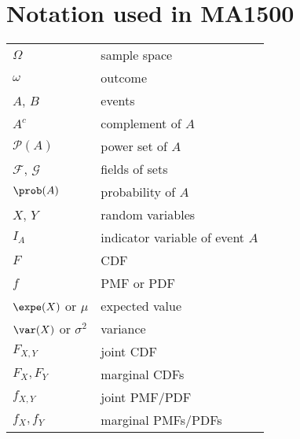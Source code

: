\section*{Notation used in MA1500}
\begin{tabular}{ll}
$\Omega$						& sample space \\
$\omega$						& outcome \\
$A$, $B$ 						& events \\
$A^c$							& complement of $A$ \\
$\mathcal{P}(A)$				& power set of $A$\\
$\mathcal{F}$, $\mathcal{G}$	& fields of sets \\
$\prob(A)$						& probability of $A$ \\
$X$, $Y$ 						& random variables \\
$I_A$							& indicator variable of event $A$ \\
$F$								& CDF \\
$f$								& PMF or PDF \\
$\expe(X)$ or $\mu$				& expected value \\
$\var(X)$ or $\sigma^2$			& variance \\
$F_{X,Y}$						& joint CDF \\
$F_X, F_Y$						& marginal CDFs \\
$f_{X,Y}$						& joint PMF/PDF \\
$f_X, f_Y$						& marginal PMFs/PDFs \\
\end{tabular}

\endinput
